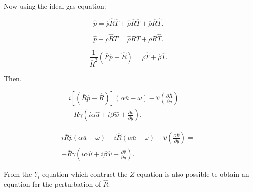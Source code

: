 Now using the ideal gas equation:

\begin{equation*}
   \hat{p}
   = 
   \overline{\rho}
   \hat{R}
   \overline{T}
   +
   \hat{\rho}
   \overline{R}
   \overline{T}
   +
   \overline{\rho}
   \overline{R}
   \hat{T}
   .
\end{equation*}

\begin{equation*}
   \hat{p}
   -
   \overline{\rho}
   \hat{R}
   \overline{T}
   = 
   \hat{\rho}
   \overline{R}
   \overline{T}
   +
   \overline{\rho}
   \overline{R}
   \hat{T}
   .
\end{equation*}

\begin{equation*}
   \frac{1}{\overline{R}^2}
   \left(
        \overline{R}\hat{p}
        -
        \hat{R}
   \right)
   = 
   \overline{\rho}
   \hat{T}
   +
   \hat{\rho}
   \overline{T}
   .
\end{equation*}

Then, 

\begin{equation*} 
\begin{split} 
i
\left[
   \left(
        \overline{R}\hat{p}
        -
        \hat{R}
   \right)
\right]
    \left(
    \alpha 
    \overline{u}
    -
    \omega 
    \right)
-
\hat{v}
\left(
    \frac{\partial \overline{R}}{\partial y} 
\right)
=
\\
-
\overline{R}
\gamma
\left(
i
\alpha
\hat{u}
+
i
\beta
\hat{w}
+
\frac{\partial \hat{v}}{\partial y}
\right)
.
\end{split} 
\end{equation*} 

\begin{equation*} 
\begin{split} 
    i
    \overline{R}\hat{p}
    \left(
    \alpha 
    \overline{u}
    -
    \omega 
    \right)
    -
    i
    \hat{R}
    \left(
    \alpha 
    \overline{u}
    -
    \omega 
    \right)
-
\hat{v}
\left(
    \frac{\partial \overline{R}}{\partial y} 
\right)
=
\\
-
\overline{R}
\gamma
\left(
i
\alpha
\hat{u}
+
i
\beta
\hat{w}
+
\frac{\partial \hat{v}}{\partial y}
\right)
.
\end{split} 
\end{equation*} 

From the $Y_i$ equation which contruct the $Z$ equation is 
also possible to obtain an equation for the perturbation of
$\hat{R}$:    

